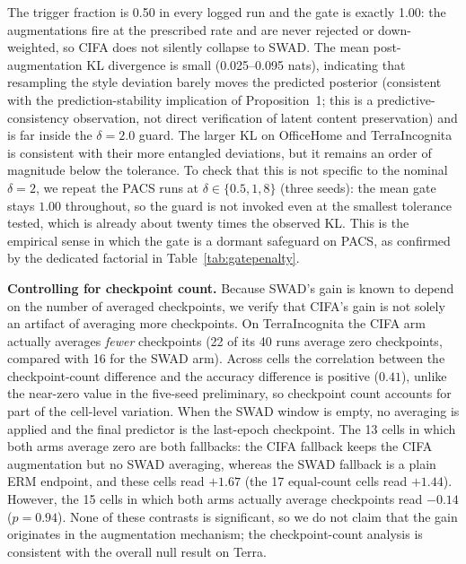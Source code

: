 \documentclass[electronics,article,submit,moreauthors]{Definitions/mdpi}
\newcommand{\add}[1]{\textcolor{addblue}{#1}}
\newcommand{\del}[1]{\textcolor{delred}{\st{#1}}}
\def\add#1{#1}%
\def\del#1{}%
\renewcommand{\add}[1]{#1}
\renewcommand{\del}[1]{}
\begin{document}
The trigger fraction is 0.50 in every logged run and the gate is exactly 1.00: the augmentations fire at the prescribed rate and are never rejected or down-weighted, so CIFA does not silently collapse to SWAD. The mean post-augmentation KL divergence is small (0.025--0.095 nats), indicating that resampling the style deviation barely moves the predicted posterior (\del{an empirical realization of the content-preservation claim of Proposition~1}\add{consistent with the prediction-stability implication of Proposition~1; this is a predictive-consistency observation, not direct verification of latent content preservation}) and is far inside the $\delta=2.0$ guard. The larger KL on OfficeHome and TerraIncognita is consistent with their more entangled deviations, but it remains an order of magnitude below the tolerance. To check that this is not specific to the nominal $\delta=2$, we repeat the PACS runs at $\delta\in\{0.5,1,8\}$ (three seeds): the mean gate stays $1.00$ throughout, so the guard is not invoked even at the smallest tolerance tested, which is already about twenty times the observed KL. This is the empirical sense in which the gate is a dormant safeguard on PACS, as confirmed by the dedicated factorial in Table~\ref{tab:gatepenalty}.

\textbf{Controlling for checkpoint count.} Because SWAD's gain is known to depend on the number of averaged checkpoints, we verify that CIFA's gain is not solely an artifact of averaging more checkpoints. On TerraIncognita the CIFA arm actually averages \emph{fewer} checkpoints (22 of its 40 runs average zero checkpoints, compared with 16 for the SWAD arm). Across cells the correlation between the checkpoint-count difference and the accuracy difference is positive ($0.41$), unlike the near-zero value in the five-seed preliminary, so checkpoint count accounts for part of the cell-level variation. \del{Restricting to the 17 cells where both arms average the same number of checkpoints, however, preserves a positive difference (mean $+1.44$; $+1.67$ on the 13 cells where both average zero). The gain therefore originates in part from the augmentation mechanism rather than entirely from the averaging schedule, though we no longer claim the checkpoint-count correlation to be negligible.}\add{When the SWAD window is empty, no averaging is applied and the final predictor is the last-epoch checkpoint. The 13 cells in which both arms average zero are both fallbacks: the CIFA fallback keeps the CIFA augmentation but no SWAD averaging, whereas the SWAD fallback is a plain ERM endpoint, and these cells read $+1.67$ (the 17 equal-count cells read $+1.44$). However, the 15 cells in which both arms actually average checkpoints read $-0.14$ ($p=0.94$). None of these contrasts is significant, so we do not claim that the gain originates in the augmentation mechanism; the checkpoint-count analysis is consistent with the overall null result on Terra.}
\end{document}
